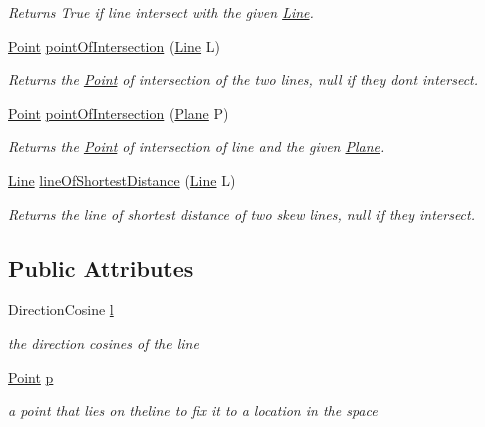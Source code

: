 \begin{DoxyCompactItemize}
\begin{DoxyCompactList}\small\item\em Returns True if line intersect with the given \mbox{\hyperlink{class_line}{Line}}. \end{DoxyCompactList}\item 
\mbox{\hyperlink{class_point}{Point}} \mbox{\hyperlink{class_line_a3abb028a100196d85dd2674c3ef86421}{point\+Of\+Intersection}} (\mbox{\hyperlink{class_line}{Line}} L)
\begin{DoxyCompactList}\small\item\em Returns the \mbox{\hyperlink{class_point}{Point}} of intersection of the two lines, null if they don\textquotesingle{}t intersect. \end{DoxyCompactList}\item 
\mbox{\hyperlink{class_point}{Point}} \mbox{\hyperlink{class_line_af5a77b743d209b9aad7b92d1fe2b786a}{point\+Of\+Intersection}} (\mbox{\hyperlink{class_plane}{Plane}} P)
\begin{DoxyCompactList}\small\item\em Returns the \mbox{\hyperlink{class_point}{Point}} of intersection of line and the given \mbox{\hyperlink{class_plane}{Plane}}. \end{DoxyCompactList}\item 
\mbox{\hyperlink{class_line}{Line}} \mbox{\hyperlink{class_line_a959d5169229a29c786deb42848ac8a1f}{line\+Of\+Shortest\+Distance}} (\mbox{\hyperlink{class_line}{Line}} L)
\begin{DoxyCompactList}\small\item\em Returns the line of shortest distance of two skew lines, null if they intersect. \end{DoxyCompactList}\end{DoxyCompactItemize}
\subsection*{Public Attributes}
\begin{DoxyCompactItemize}
\item 
Direction\+Cosine \mbox{\hyperlink{class_line_a03e62995fcb8f2cdd535b19f38dc7beb}{l}}
\begin{DoxyCompactList}\small\item\em the direction cosines of the line \end{DoxyCompactList}\item 
\mbox{\hyperlink{class_point}{Point}} \mbox{\hyperlink{class_line_ade526d53a83ae2cfad4472affeb9ce8d}{p}}
\begin{DoxyCompactList}\small\item\em a point that lies on theline to fix it to a location in the space \end{DoxyCompactList}\end{DoxyCompactItemize}


